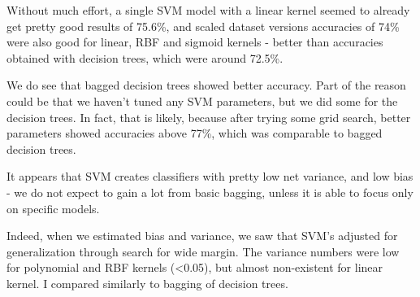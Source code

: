 \documentclass{article}
\begin{document}
Without much effort, a single SVM model with a linear kernel seemed to already get pretty good results of 75.6\%, and scaled dataset versions accuracies of 74\% were also good for linear, RBF and sigmoid kernels - better than accuracies obtained with decision trees, which were around 72.5\%.

We do see that bagged decision trees showed better accuracy. Part of the reason could be that we haven't tuned any SVM parameters, but we did some for the decision trees. In fact, that is likely, because after trying some grid search, better parameters showed accuracies above 77\%, which was comparable to bagged decision trees.

It appears that SVM creates classifiers with pretty low net variance, and low bias - we do not expect to gain a lot from basic bagging, unless it is able to focus only on specific models.

Indeed, when we estimated bias and variance, we saw that SVM's adjusted for generalization through search for wide margin. The variance numbers were low for polynomial and RBF kernels (<0.05), but almost non-existent for linear kernel. I compared similarly to bagging of decision trees.
\end{document}
